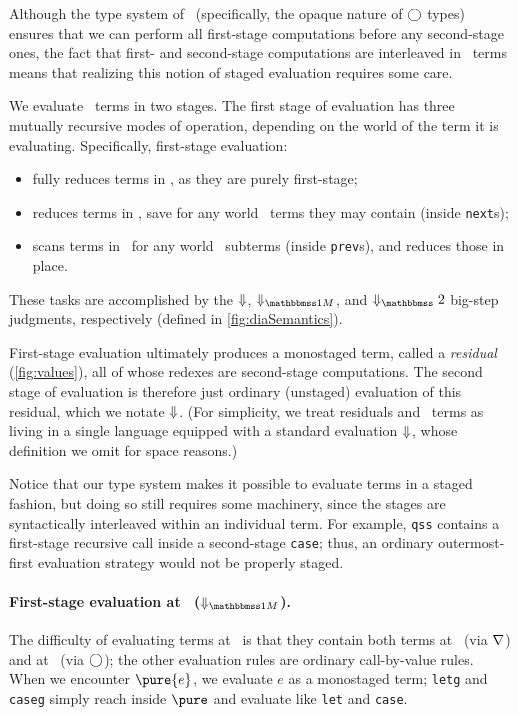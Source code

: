 \begin{abstrsyn}

Although the type system of \lang\ (specifically, the opaque nature of $\bigcirc$
types) ensures that we can perform all first-stage computations before any
second-stage ones, the fact that first- and second-stage computations are
interleaved in \lang\ terms means that realizing this notion of staged
evaluation requires some care.

We evaluate \lang\ terms in two stages. The first stage of evaluation has three
mutually recursive modes of operation, depending on the world of the term it is
evaluating. Specifically, first-stage evaluation:
\begin{itemize}
\item fully reduces terms in \bbonep, as they are purely first-stage;
\item reduces terms in \bbonem, save for any world \bbtwo\ terms they may
contain (inside \texttt{next}s);
\item scans terms in \bbtwo\ for any world \bbonem\ subterms (inside \texttt{prev}s), 
and reduces those in place.
\end{itemize}
These tasks are accomplished by the ${\Downarrow}$, $\redonesym$, and $\redtwosym$
big-step judgments, respectively (defined in \ref{fig:diaSemantics}).

First-stage evaluation ultimately produces a monostaged term, called a \emph{residual}
(\ref{fig:values}), all of whose redexes are second-stage computations. The
second stage of evaluation is therefore just ordinary (unstaged) evaluation of
this residual, which we notate ${\Downarrow}$. (For simplicity, we treat residuals
and \bbonep\ terms as living in a single language equipped with a standard
evaluation ${\Downarrow}$, whose definition we omit for space reasons.)

Notice that our type system makes it possible to evaluate terms in a staged
fashion, but doing so still requires some machinery, since the stages are
syntactically interleaved within an individual term. For example,
\texttt{qss} contains a first-stage recursive call inside a second-stage
\texttt{case}; thus, an ordinary outermost-first evaluation strategy would not
be properly staged.

\paragraph{First-stage evaluation at \bbonem\ ($\redonesym$).}
The difficulty of evaluating terms at \bbonem\ is that they contain both terms
at \bbonep\ (via $\nabla$) and at \bbtwo\ (via $\bigcirc$); the other evaluation
rules are ordinary call-by-value rules. When we encounter $\pure{e}$, we
evaluate $e$ as a monostaged term; \texttt{letg} and \texttt{caseg} simply reach
inside $\pure$ and evaluate like \texttt{let} and \texttt{case}.


\end{abstrsyn}

